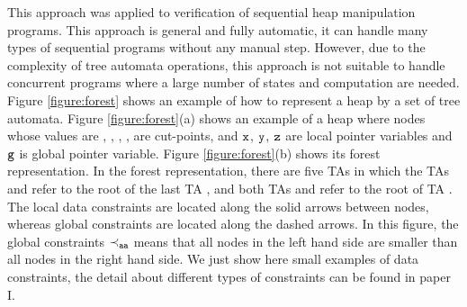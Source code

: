 This approach was applied to verification of sequential heap manipulation programs. This approach is general and fully automatic, it can handle many types of sequential programs without any manual step. However, due to the complexity of tree automata operations, this approach is not suitable to handle concurrent programs where a large number of states and computation are needed. Figure \ref{figure:forest} shows an example of how to represent a heap by a set of tree automata. Figure \ref{figure:forest}(a) shows an example of a heap where nodes whose values are \nodea, \nodeb, \nodec, \noded, \nodee \; are cut-points, and $\tt x$, $\tt y$, $\tt z$ are local pointer variables and $\tt g$ is global pointer variable. Figure \ref{figure:forest}(b) shows its forest representation. In the forest representation, there are five TAs in which the TAs \taa \; and \tac \; refer to the root of the last TA \tae\;, and both TAs \tab \; and \tad \; refer to the root of TA \tac \;. The local data constraints are located along the solid arrows between nodes, whereas global constraints are located along the dashed arrows. In this figure, the global constraints $\tt \prec_{aa}$ means that all nodes in the left hand side are smaller than all nodes in the right hand side.  We just show here small examples of data constraints, the detail about different types of constraints can be found in paper I.   

